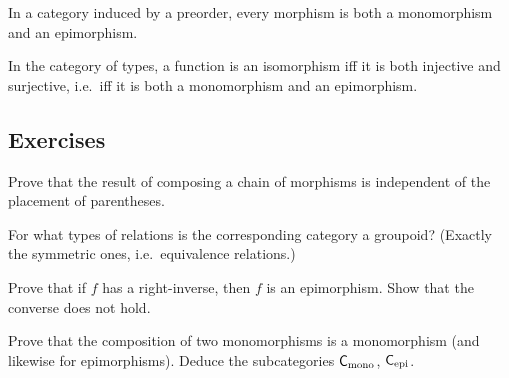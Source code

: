 \begin{proposition}
  \label{prop:prelims:mono-epi-preorder}
  In a category induced by a preorder, every morphism is both a
  monomorphism and an epimorphism.
\end{proposition}

\begin{proposition}
  \label{prop:prelims:iso-iff-bijective-type-category}
  In the category of types, a function is an isomorphism iff it is
  both injective and surjective, i.e.\ iff it is both a monomorphism
  and an epimorphism.
\end{proposition}

\subsection*{Exercises}

\begin{exercise}
  \label{exer:prelims:assoc-morphism}
  Prove that the result of composing a chain of morphisms is
  independent of the placement of parentheses.
\end{exercise}

\begin{exercise}
  \label{exer:prelims:cat-rel-groupoid}
  For what types of relations is the corresponding category a
  groupoid? (Exactly the symmetric ones, i.e.\ equivalence
  relations.)
\end{exercise}

\begin{exercise}
  \label{exer:prelims:cat-rinv-iff-epi}
  Prove that if $f$ has a right-inverse, then $f$ is an epimorphism.
  Show that the converse does not hold.
\end{exercise}

\begin{exercise}
  \label{exer:prelims:subcat-of-monomorph}
  Prove that the composition of two monomorphisms is a monomorphism
  (and likewise for epimorphisms). Deduce the subcategories
  $\mathsf{C}_{\mathrm{mono}}$, $\mathsf{C}_{\mathrm{epi}}$.
\end{exercise}

